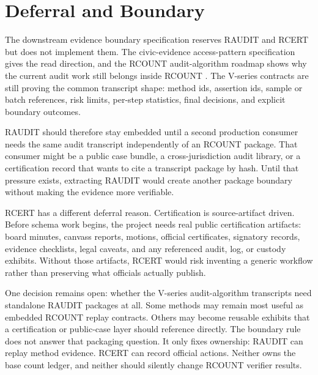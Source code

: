 \section{Deferral and Boundary}

The downstream evidence boundary specification reserves RAUDIT and RCERT but
does not implement them. The civic-evidence access-pattern specification gives
the read direction, and the RCOUNT audit-algorithm roadmap shows why the current
audit work still belongs inside RCOUNT \citep{civic-evidence-boundaries-2026}.
The V-series contracts are still proving the common transcript shape: method
ids, assertion ids, sample or batch references, risk limits, per-step statistics,
final decisions, and explicit boundary outcomes.

RAUDIT should therefore stay embedded until a second production consumer needs
the same audit transcript independently of an RCOUNT package. That consumer
might be a public case bundle, a cross-jurisdiction audit library, or a
certification record that wants to cite a transcript package by hash. Until that
pressure exists, extracting RAUDIT would create another package boundary without
making the evidence more verifiable.

RCERT has a different deferral reason. Certification is source-artifact driven.
Before schema work begins, the project needs real public certification
artifacts: board minutes, canvass reports, motions, official certificates,
signatory records, evidence checklists, legal caveats, and any referenced audit,
log, or custody exhibits. Without those artifacts, RCERT would risk inventing a
generic workflow rather than preserving what officials actually publish.

One decision remains open: whether the V-series audit-algorithm transcripts need
standalone RAUDIT packages at all. Some methods may remain most useful as
embedded RCOUNT replay contracts. Others may become reusable exhibits that a
certification or public-case layer should reference directly. The boundary rule
does not answer that packaging question. It only fixes ownership: RAUDIT can
replay method evidence. RCERT can record official actions. Neither owns the base
count ledger, and neither should silently change RCOUNT verifier results.
